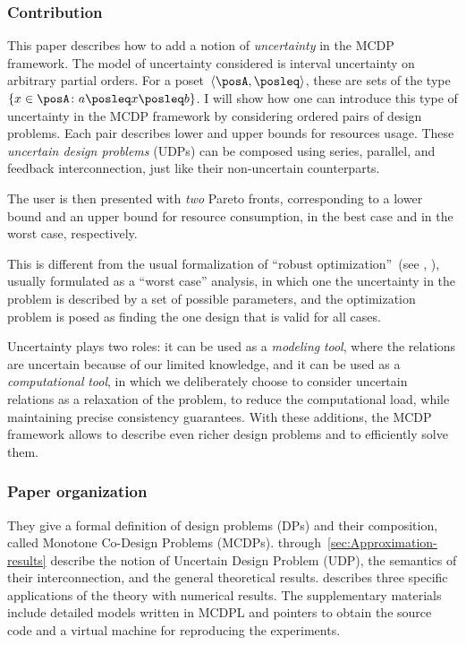\subsubsection*{Contribution}

This paper describes how to add a notion of \emph{uncertainty} in the MCDP framework.
The model of uncertainty considered is interval uncertainty on arbitrary partial orders.
For a poset~$\left\langle \posA,\posleq\right\rangle $, these are sets of the type~$\{x\in\posA\colon a\posleq x\posleq b\}$.
I will show how one can introduce this type of uncertainty in the MCDP framework by considering ordered pairs of design problems.
Each pair describes lower and upper bounds for resources usage.
These \emph{uncertain design problems} (UDPs) can be composed using series, parallel, and feedback interconnection, just like their non-uncertain counterparts.

The user is then presented with \emph{two} Pareto fronts, corresponding to a lower bound and an upper bound for resource consumption, in the best case and in the worst case, respectively.

This is different from the usual formalization of ``robust optimization''~(see \eg , \cite{bertsimas11theory,ben-tal09}), usually formulated as a ``worst case'' analysis, in which one the uncertainty in the problem is described by a set of possible parameters, and the optimization problem is posed as finding the one design that is valid for all cases.

Uncertainty plays two roles: it can be used as a \emph{modeling} \emph{tool}, where the relations are uncertain because of our limited knowledge, and it can be used as a \emph{computational} \emph{tool}, in which we deliberately choose to consider uncertain relations as a relaxation of the problem, to reduce the computational load, while maintaining precise consistency guarantees.
With these additions, the MCDP framework allows to describe even richer design problems and to efficiently solve them.

\subsubsection*{Paper organization}


They give a formal definition of design problems
(DPs) and their composition, called Monotone Co-Design Problems (MCDPs).
 through~\cref{sec:Approximation-results}
describe the notion of Uncertain Design Problem (UDP), the semantics of their interconnection, and the general theoretical results.
 describes three specific applications of the theory with numerical results.
The supplementary materials include detailed models written in MCDPL and pointers to obtain the source code and a virtual machine for reproducing the experiments.

